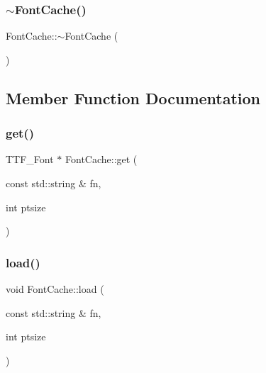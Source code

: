 \subsubsection{\texorpdfstring{$\sim$FontCache()}{~FontCache()}}
{\footnotesize\ttfamily Font\+Cache\+::$\sim$\+Font\+Cache (\begin{DoxyParamCaption}{ }\end{DoxyParamCaption})}



\subsection{Member Function Documentation}
\mbox{\label{classsage_1_1FontCache_a36e3d099603a50bc73a4d8ff6d6bc8dc}} 
\subsubsection{\texorpdfstring{get()}{get()}}
{\footnotesize\ttfamily T\+T\+F\+\_\+\+Font $\ast$ Font\+Cache\+::get (\begin{DoxyParamCaption}\item[{const std\+::string \&}]{fn,  }\item[{int}]{ptsize }\end{DoxyParamCaption})}

\mbox{\label{classsage_1_1FontCache_a2221e34a4ddd51266f374b727baac79e}} 
\subsubsection{\texorpdfstring{load()}{load()}}
{\footnotesize\ttfamily void Font\+Cache\+::load (\begin{DoxyParamCaption}\item[{const std\+::string \&}]{fn,  }\item[{int}]{ptsize }\end{DoxyParamCaption})}

\mbox{\label{classsage_1_1FontCache_a9792b2e9a7db90b2c44a9ebfd8fe9067}} 
